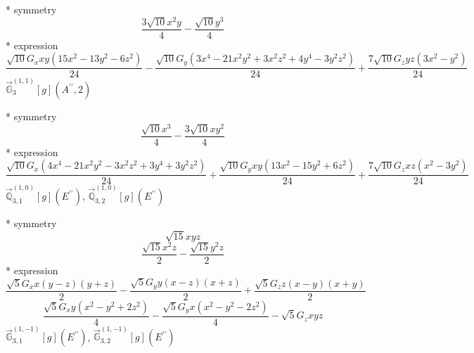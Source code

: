 \documentclass[fleqn,8pt]{jsarticle}
\begin{document}
\noindent\quad ** symmetry
\begin{dmath*}
\frac{3 \sqrt{10} x^{2} y}{4} - \frac{\sqrt{10} y^{3}}{4}
\end{dmath*}
\noindent\quad ** expression
\begin{dmath*}
\frac{\sqrt{10} G_{x} x y \left(15 x^{2} - 13 y^{2} - 6 z^{2}\right)}{24} - \frac{\sqrt{10} G_{y} \left(3 x^{4} - 21 x^{2} y^{2} + 3 x^{2} z^{2} + 4 y^{4} - 3 y^{2} z^{2}\right)}{24} + \frac{7 \sqrt{10} G_{z} y z \left(3 x^{2} - y^{2}\right)}{24}
\end{dmath*}
\noindent\quad $\vec{\mathbb{G}}_{3}^{(1,1)}[g](A^{\prime\prime},2)$

\noindent\quad ** symmetry
\begin{dmath*}
\frac{\sqrt{10} x^{3}}{4} - \frac{3 \sqrt{10} x y^{2}}{4}
\end{dmath*}
\noindent\quad ** expression
\begin{dmath*}
\frac{\sqrt{10} G_{x} \left(4 x^{4} - 21 x^{2} y^{2} - 3 x^{2} z^{2} + 3 y^{4} + 3 y^{2} z^{2}\right)}{24} + \frac{\sqrt{10} G_{y} x y \left(13 x^{2} - 15 y^{2} + 6 z^{2}\right)}{24} + \frac{7 \sqrt{10} G_{z} x z \left(x^{2} - 3 y^{2}\right)}{24}
\end{dmath*}
\noindent\quad $\vec{\mathbb{Q}}_{3,1}^{(1,0)}[g](E^{\prime\prime})$, $\vec{\mathbb{Q}}_{3,2}^{(1,0)}[g](E^{\prime\prime})$

\noindent\quad ** symmetry
\begin{dmath*}
\sqrt{15} x y z
\end{dmath*}
\begin{dmath*}
\frac{\sqrt{15} x^{2} z}{2} - \frac{\sqrt{15} y^{2} z}{2}
\end{dmath*}
\noindent\quad ** expression
\begin{dmath*}
\frac{\sqrt{5} G_{x} x \left(y - z\right) \left(y + z\right)}{2} - \frac{\sqrt{5} G_{y} y \left(x - z\right) \left(x + z\right)}{2} + \frac{\sqrt{5} G_{z} z \left(x - y\right) \left(x + y\right)}{2}
\end{dmath*}
\begin{dmath*}
\frac{\sqrt{5} G_{x} y \left(x^{2} - y^{2} + 2 z^{2}\right)}{4} - \frac{\sqrt{5} G_{y} x \left(x^{2} - y^{2} - 2 z^{2}\right)}{4} - \sqrt{5} G_{z} x y z
\end{dmath*}
\noindent\quad $\vec{\mathbb{G}}_{3,1}^{(1,-1)}[g](E^{\prime\prime})$, $\vec{\mathbb{G}}_{3,2}^{(1,-1)}[g](E^{\prime\prime})$
\end{document}
